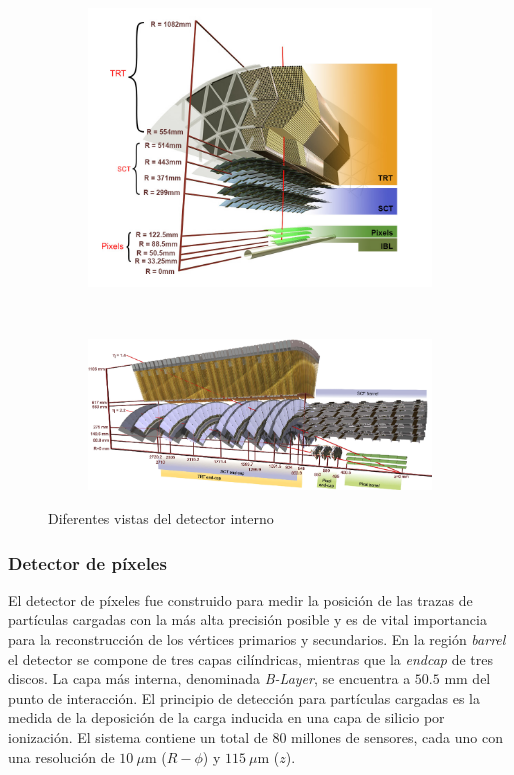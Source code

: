 \begin{figure}
\centering
  \begin{subfigure}[b]{0.49\textwidth}
    \includegraphics[width=\textwidth]{images/pixel_1.png}
  \end{subfigure}
  ~
  \begin{subfigure}[b]{0.49\textwidth}
    \includegraphics[width=\textwidth]{images/pixel_4.png}
  \end{subfigure}
  \caption{Diferentes vistas del detector interno}
  \label{pixel_23}
\end{figure}


\subsubsection{Detector de píxeles}

El detector de píxeles fue construido para medir la posición de las trazas de partículas cargadas con la más alta precisión posible y es de vital importancia para la reconstrucción de los vértices primarios y secundarios. En la región \textit{barrel} el detector se compone de tres capas cilíndricas, mientras que la \textit{endcap} de tres discos. La capa más interna, denominada \textit{B-Layer}, se encuentra a $50.5$ mm del punto de interacción. El principio de detección para partículas cargadas es la medida de la deposición de la carga inducida en una capa de silicio por ionización. El sistema contiene un total de $80$ millones de sensores, cada uno con una resolución de $10\:\mu$m ($R-\phi$) y $115\:\mu$m ($z$).

